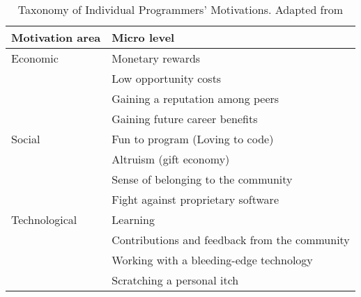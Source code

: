 \begin{table}
    \caption{Taxonomy of Individual Programmers’ Motivations. Adapted from \parencite{bonaccorsiComparingMotivationsIndividual2006}}
    \label{tab:taxonomy}
    \begin{tabularx}{\textwidth}{l X} %
    \toprule
    \textbf{Motivation area} & \textbf{Micro level} \\
    \midrule
    Economic & Monetary rewards \\
     & Low opportunity costs \\
     & Gaining a reputation among peers \\
     & Gaining future career benefits \\
    \midrule
    Social & Fun to program (Loving to code) \\
     & Altruism (gift economy) \\
     & Sense of belonging to the community \\
     & Fight against proprietary software \\
    \midrule
    Technological & Learning \\
     & Contributions and feedback from the community \\
     & Working with a bleeding-edge technology \\
     & Scratching a personal itch \\
    \bottomrule
    \end{tabularx} %
\end{table}